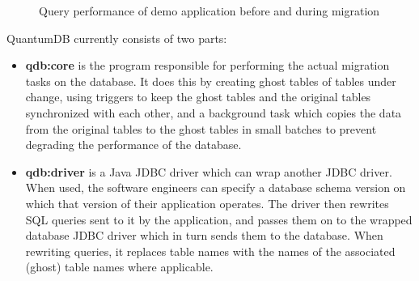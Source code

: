 \documentclass[conference]{IEEEtran}
\begin{document}
\begin{figure}%
    \centering
    \qquad
    \qquad
    \caption{Query performance of demo application before and during migration}%
    \label{fig:migration-stages}%
\end{figure}

QuantumDB currently consists of two parts: 
\begin{itemize}
  \item{\textbf{qdb:core} is the program responsible for performing the actual migration tasks on the database. It does this by creating ghost tables of tables under change, using triggers to keep the ghost tables and the original tables synchronized with each other, and a background task which copies the data from the original tables to the ghost tables in small batches to prevent degrading the performance of the database.}
  \item{\textbf{qdb:driver} is a Java JDBC driver which can wrap another JDBC driver. When used, the software engineers can specify a database schema version on which that version of their application operates. The driver then rewrites SQL queries sent to it by the application, and passes them on to the wrapped database JDBC driver which in turn sends them to the database. When rewriting queries, it replaces table names with the names of the associated (ghost) table names where applicable.}
\end{itemize}
\end{document}
